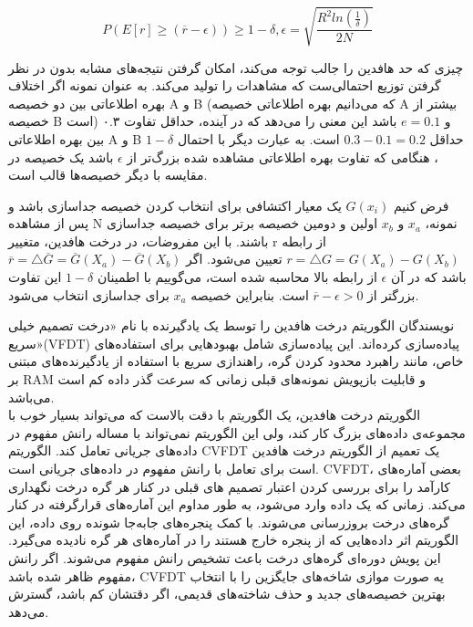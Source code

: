 $$ P(E[r] \geq (\overline{r} - \epsilon)) \geq 1 - \delta, \epsilon = \sqrt{\frac{R^2ln(\frac{1}{\delta})}{2N}} $$



چیزی که حد هافدین را جالب توجه می‌کند، امکان گرفتن نتیجه‌های مشابه بدون در نظر گرفتن توزیع احتمالی‌ست که مشاهدات را تولید می‌کند. به عنوان نمونه اگر اختلاف بهره اطلاعاتی بین دو خصیصه A و B (که می‌دانیم بهره اطلاعاتی خصیصه A بیشتر از خصیصه B است) $ ۰.۳$ و $ e=0.1 $ باشد این معنی را می‌دهد که در آینده، حداقل تفاوت بین بهره اطلاعاتی A و B حداقل $ 0.3 - 0.1 = 0.2 $ است. به عبارت دیگر با احتمال $1 - \delta$، هنگامی که تفاوت بهره اطلاعاتی مشاهده شده بزرگ‌تر از  $ \epsilon $ باشد یک خصیصه در مقایسه با دیگر خصیصه‌ها قالب است.

فرض کنیم $ G(x_{i}) $ یک معیار اکتشافی برای انتخاب کردن خصیصه جداسازی باشد و پس از مشاهده N نمونه، $x_{a}$ و $x_{b}$ اولین و دومین خصیصه برتر برای خصیصه جداسازی باشند. با این مفروضات، در درخت هافدین، متغییر r از رابطه $ r = \triangle G = G(X_a) - G(X_b) $ تعیین می‌شود.
 اگر $ \overline{r} = \triangle \overline{G} = \overline{G}(X_a) - \overline{G}(X_b) $ باشد که در آن $\epsilon $ از رابطه بالا محاسبه شده است،
می‌گوییم با اطمینان $1 - \delta $ این تفاوت بزرگتر از $ \overline{r} - \epsilon > 0 $ است. بنابراین خصیصه $x_{a}$ برای جداسازی انتخاب می‌شود.


نویسندگان الگوریتم درخت هافدین را توسط یک یادگیرنده با نام «درخت تصمیم خیلی سریع»(VFDT) پیاده‌سازی کرده‌اند. این پیاده‌سازی شامل بهبودهایی برای استفاده‌های خاص، مانند راهبرد محدود کردن گره، راهندازی سریع با استفاده از یادگیرنده‌های مبتنی بر RAM و قابلیت بازپویش نمونه‌های قبلی زمانی که سرعت گذر داده کم است می‌باشد.
\\
الگوریتم درخت هافدین،‌ یک الگوریتم با دقت بالاست که می‌تواند بسیار خوب با مجموعه‌ی داده‌های بزرگ کار کند، ولی این الگوریتم نمی‌تواند با مساله رانش مفهوم در داده‌های جریانی تعامل کند. الگوریتم CVFDT یک تعمیم از الگوریتم درخت هافدین است برای تعامل با رانش مفهوم در داده‌های جریانی است. CVFDT، بعضی آماره‌های کارآمد را برای بررسی کردن اعتبار تصمیم های قبلی در کنار هر گره درخت نگهداری می‌کند. زمانی که یک داده وارد می‌شود، به طور مداوم این آماره‌های قرارگرفته در کنار گره‌های درخت بروزرسانی می‌شوند. با کمک پنجره‌های جابه‌جا شونده روی داده، این الگوریتم اثر داده‌هایی که از پنجره خارج هستند را در آماره‌های هر گره نادیده می‌گیرد. این پویش دوره‌ای گره‌های درخت‌ باعث تشخیص رانش مفهوم می‌شوند. اگر رانش مفهوم ظاهر شده باشد، CVFDT یه صورت موازی شاخه‌های جایگزین را با انتخاب بهترین خصیصه‌های جدید و حذف شاخته‌های قدیمی، اگر دقتشان کم باشد، گسترش می‌دهد.

